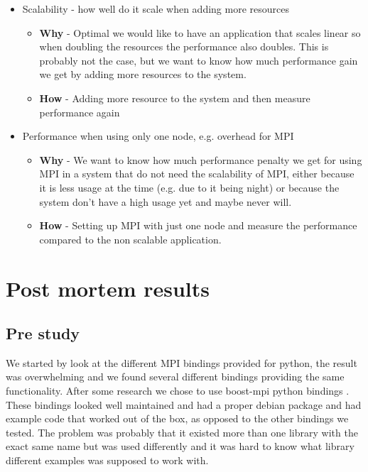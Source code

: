 \documentclass{article}
\begin{document}
{\begin{itemize}
\begin{itemize}
\item{ \textbf{Why} - Because one of the main reason for scalability is to increase the
 performance we want to know how much we are able to increase it by using MPI. }
\item{ \textbf{How} - Measure the time to run the program with \emph{time}}
\end{itemize}
\item Scalability - how well do it scale when adding more resources
\begin{itemize}
\item{ \textbf{Why} - Optimal we would like to have an application that scales linear
 so when doubling the resources the performance also doubles. This is probably 
 not the case, but we want to know how much performance gain we get by adding
 more resources to the system. }
\item{ \textbf{How} - Adding more resource to the system and then measure performance
 again}
\end{itemize}
\item Performance when using only one node, e.g. overhead for MPI
\begin{itemize}
\item{ \textbf{Why} - We want to know how much performance penalty we get for using
MPI in a system that do not need the scalability of MPI, either because it is 
less usage at the time (e.g. due to it being night) or because the system
don't have a high usage yet and maybe never will.}
\item{ \textbf{How} - Setting up MPI with just one node and measure the performance
 compared to the non scalable application. }
\end{itemize}
\end{itemize}


\section{Post mortem results}\label{mpi}
\subsection{Pre study}
We started by look at the different MPI bindings provided for python, the result
was overwhelming and we found several different bindings providing the same
functionality. After some research we chose to use boost-mpi python bindings
\cite{boost-mpi}. These bindings looked well maintained and had a proper
debian package and had example code that worked out of the box, as opposed to
the other bindings we tested. The problem was probably that it existed more
than one library with the exact same name but was used differently and it was
hard to know what library different examples was supposed to work with. 

}
\end{document}
